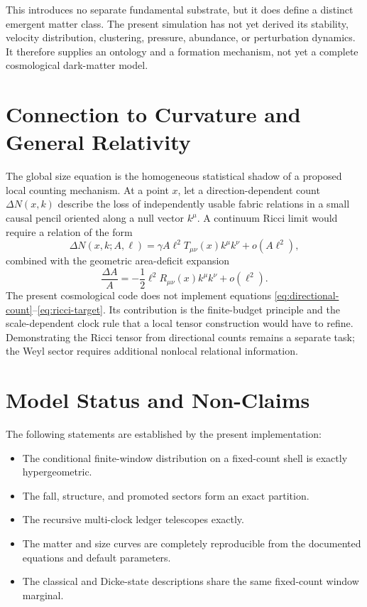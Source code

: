 \documentclass[11pt]{article}
\begin{document}
This introduces no separate fundamental substrate, but it does define a
distinct emergent matter class.  The present simulation has not yet derived
its stability, velocity distribution, clustering, pressure, abundance, or
perturbation dynamics.  It therefore supplies an ontology and a formation
mechanism, not yet a complete cosmological dark-matter model.

\section{Connection to Curvature and General Relativity}
\label{sec:gr}

The global size equation is the homogeneous statistical shadow of a proposed
local counting mechanism.  At a point $x$, let a direction-dependent count
$\Delta N(x,k)$ describe the loss of independently usable fabric relations in
a small causal pencil oriented along a null vector $k^\mu$.  A continuum
Ricci limit would require a relation of the form
\begin{equation}
 \Delta N(x,k;A,\ell)
 =\gamma A\ell^2 T_{\mu\nu}(x)k^\mu k^\nu
 +o(A\ell^2),
 \label{eq:directional-count}
\end{equation}
combined with the geometric area-deficit expansion
\begin{equation}
 \frac{\Delta A}{A}
 =-\frac12\ell^2 R_{\mu\nu}(x)k^\mu k^\nu+o(\ell^2).
 \label{eq:ricci-target}
\end{equation}
The present cosmological code does not implement equations
\eqref{eq:directional-count}--\eqref{eq:ricci-target}.  Its contribution is
the finite-budget principle and the scale-dependent clock rule that a local
tensor construction would have to refine.  Demonstrating the Ricci tensor
from directional counts remains a separate task; the Weyl sector requires
additional nonlocal relational information.

\section{Model Status and Non-Claims}
\label{sec:status}

The following statements are established by the present implementation:
\begin{itemize}
  \item The conditional finite-window distribution on a fixed-count shell is
        exactly hypergeometric.
  \item The fall, structure, and promoted sectors form an exact partition.
  \item The recursive multi-clock ledger telescopes exactly.
  \item The matter and size curves are completely reproducible from the
        documented equations and default parameters.
  \item The classical and Dicke-state descriptions share the same
        fixed-count window marginal.
\end{itemize}
\end{document}
